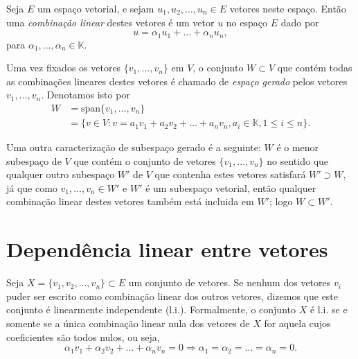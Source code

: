 \begin{defi}
  Seja $E$ um espaço vetorial, e sejam $u_1,u_2,\ldots,u_n \in E$ vetores neste espaço. Então uma \emph{combinação linear} destes vetores é um vetor $u$ no espaço $E$ dado por
  \begin{equation*}
    u = \alpha_1 u_1+\ldots+\alpha_n u_n,
  \end{equation*}
  para $\alpha_1,\ldots,\alpha_n \in {\mathbb{K}}$.
\end{defi}

\begin{defi}
  Uma vez fixados os vetores $\{ v_1,\ldots,v_n\}$ em $V$, o conjunto $W\subset V$ que contém todas as combinações lineares destes vetores é chamado de \emph{espaço gerado} pelos vetores $v_1,\ldots,v_n$. Denotamos isto por
  \begin{align*}
    W &= \text{span}\{v_1,\ldots,v_n\}\\
    &= \{ v \in V : v = a_1v_1 + a_2v_2 + \ldots + a_n v_n, a_i\in {\mathbb{K}}, 1\leq i \leq n\}.
  \end{align*}
\end{defi}

Uma outra caracterização de subespaço gerado é a seguinte: $W$ é o menor subespaço de $V$ que contém o conjunto de vetores $\{ v_1,\ldots,v_n\}$ no sentido que qualquer outro subespaço $W'$ de $V$ que contenha estes vetores satisfará $W' \supset W$, já que como $v_1,\ldots,v_n \in W'$ e $W'$ é um subespaço vetorial, então qualquer combinação linear destes vetores também está incluida em $W'$; logo $W\subset W'$.

\section{Dependência linear entre vetores}

\begin{defi}
	Seja $X=\{v_1,v_2,\ldots,v_n\}\subset E$ um conjunto de vetores. Se nenhum dos vetores $v_i$ puder ser escrito como combinação linear dos outros vetores, dizemos que este conjunto é linearmente independente (l.i.). Formalmente, o conjunto $X$ é l.i. se e somente se a única combinação linear nula dos vetores de $X$ for aquela cujos coeficientes são todos nulos, ou seja,
    \begin{equation*}
    \alpha_1v_1+\alpha_2 v_2 + \ldots + \alpha_n v_n = 0 \Rightarrow \alpha_1=\alpha_2=\ldots=\alpha_n=0.
    \end{equation*}
\end{defi}

